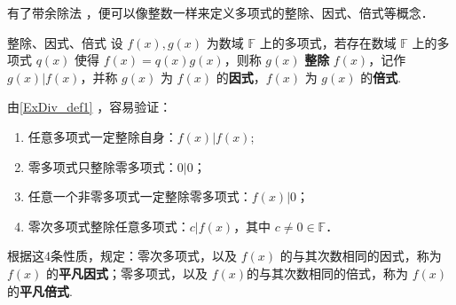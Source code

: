 
\begin{issues}
\issueTODO
\end{issues}

有了带余除法 ，便可以像整数一样来定义多项式的整除、因式、倍式等概念．
\begin{definition}{整除、因式、倍式}\label{ExDiv_def1}
设 $f(x),g(x)$ 为数域 $\mathbb{F}$ 上的多项式，若存在数域 $\mathbb{F}$ 上的多项式 $q(x)$ 使得 $f(x)=q(x)g(x)$，则称 $g(x)$ \textbf{整除} $f(x)$，记作 $g(x)|f(x)$，并称 $g(x)$ 为 $f(x)$ 的\textbf{因式}，$f(x)$ 为 $g(x)$ 的\textbf{倍式}.
\end{definition}
由\autoref{ExDiv_def1} ，容易验证：
\begin{enumerate}
\item 任意多项式一定整除自身：$f(x)|f(x)$;
\item 零多项式只整除零多项式：$0|0$；
\item 任意一个非零多项式一定整除零多项式：$f(x)|0$；
\item 零次多项式整除任意多项式：$c|f(x)$，其中 $c\neq0\in\mathbb{F}$．
\end{enumerate}
根据这4条性质，规定：零次多项式，以及 $f(x)$ 的与其次数相同的因式，称为 $f(x)$ 的\textbf{平凡因式}；零多项式，以及 $f(x)$的与其次数相同的倍式，称为 $f(x)$ 的\textbf{平凡倍式}.
